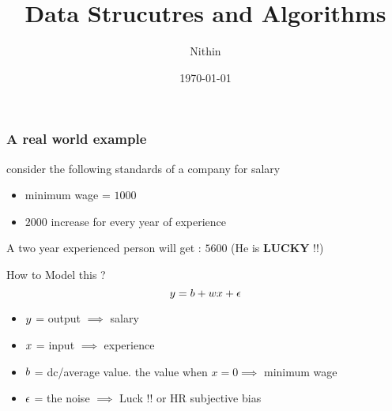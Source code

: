 \documentclass{beamer}
\title{Data Strucutres and Algorithms}
\author{Nithin}
\institute{}
\date{\today}
\begin{document}
\begin{frame}
 \frametitle{A real world example}
 consider the following standards of a company for salary
 \begin{itemize}
  \item minimum wage = $1000$
  \item $2000$ increase for every year of experience
 \end{itemize}
 A two year experienced person will get :
 \pause
  $5600$ (He is \textbf{LUCKY} !!)
\pause
\begin{block}{How to Model this ?}
\pause
\begin{displaymath}
\mathnormal{y = b + wx + \epsilon}
\end{displaymath}
\end{block}
\pause
\begin{itemize}
    \item $\mathnormal{y}$ = output  $\implies$ salary
    \pause
    \item $\mathnormal{x}$ = input $\implies$ experience
    \pause
    \item $\mathnormal{b}$ = dc/average value. the value when $x = 0 \implies$ minimum wage
    \pause
    \item $\mathnormal{\epsilon}$ = the noise $\implies$ Luck !! or HR subjective bias
\end{itemize}

\end{frame}
\end{document}
